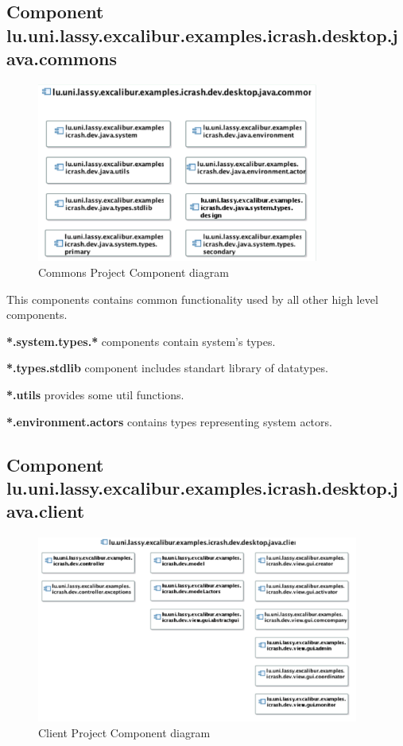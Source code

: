 \subsection{Component lu.uni.lassy.excalibur.examples.icrash.desktop.java.commons}
\begin{figure}[H]
\begin{center}
  \includegraphics[width=350px]{images/architecture/implementation-view/commons_project.eps}
  \caption{Commons Project Component diagram}
  \label{commons_project_comp_diag}
\end{center}
\end{figure}

This components contains common functionality used by all other high level
components. 

\textbf{*.system.types.*} components contain system's types.

\textbf{*.types.stdlib} component includes standart library of datatypes.

\textbf{*.utils} provides some util functions.

\textbf{*.environment.actors} contains types representing system actors. 

\subsection{Component lu.uni.lassy.excalibur.examples.icrash.desktop.java.client}
\begin{figure}[H]
\begin{center}
  \includegraphics[width=400px]{images/architecture/implementation-view/client_project.eps}
  \caption{Client Project Component diagram}
  \label{client_project_comp_diag}
\end{center}
\end{figure}

